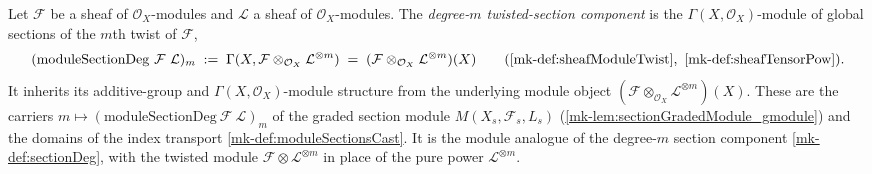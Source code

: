 \begin{definition}\label{mk-def:moduleSectionDeg}
  \leanok

  Let \(\mathcal{F}\) be a sheaf of \(\mathcal{O}_X\)-modules and \(\mathcal{L}\) a
  sheaf of \(\mathcal{O}_X\)-modules. The \emph{degree-\(m\) twisted-section
  component} is the \(\Gamma(X,\mathcal{O}_X)\)-module of global sections of the
  \(m\)th twist of \(\mathcal{F}\),
  \[
    (\mathrm{moduleSectionDeg}\ \mathcal{F}\ \mathcal{L})_m
      \;:=\; \Gamma(X, \mathcal{F} \otimes_{\mathcal{O}_X} \mathcal{L}^{\otimes m})
      \;=\; (\mathcal{F} \otimes_{\mathcal{O}_X} \mathcal{L}^{\otimes m})(X)
        \qquad(\ref{mk-def:sheafModuleTwist},\ \ref{mk-def:sheafTensorPow}).
  \]
  It inherits its additive-group and \(\Gamma(X,\mathcal{O}_X)\)-module structure
  from the underlying module object
  \((\mathcal{F} \otimes_{\mathcal{O}_X} \mathcal{L}^{\otimes m})(X)\). These are the
  carriers \(m \mapsto (\mathrm{moduleSectionDeg}\ \mathcal{F}\ \mathcal{L})_m\) of
  the graded section module \(M(X_s, \mathcal{F}_s, L_s)\)
  (\ref{mk-lem:sectionGradedModule_gmodule}) and the domains of the index transport
  \ref{mk-def:moduleSectionsCast}. It is the module analogue of the degree-\(m\)
  section component \ref{mk-def:sectionDeg}, with the twisted module
  \(\mathcal{F} \otimes \mathcal{L}^{\otimes m}\) in place of the pure power
  \(\mathcal{L}^{\otimes m}\).
\end{definition}

